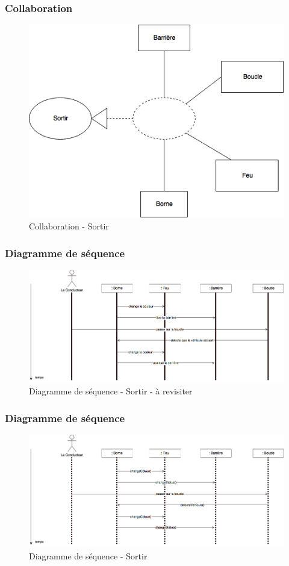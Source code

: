 \subsubsection{Collaboration}
\begin{figure}[!htb]
    \centering
    \includegraphics[scale=0.6]{02_Desenvolvimento/TD2/images/ColaSortir.png}
    \caption{Collaboration - Sortir}
    \label{fig:DARentrer}
\end{figure}
\newpage    
\subsubsection{Diagramme de séquence}
\begin{figure}[!htb]
    \centering
    \includegraphics[scale=0.5]{02_Desenvolvimento/TD2/images/DSSortir.png}
    \caption{Diagramme de séquence - Sortir - à revisiter }
    \label{fig:DARentrer}
\end{figure}
\subsubsection{Diagramme de séquence}
\begin{figure}[!htb]
    \centering
    \includegraphics[scale=0.5]{02_Desenvolvimento/TD2/images/v2-DSSortir.png}
    \caption{Diagramme de séquence - Sortir}
    \label{fig:DARentrer}
\end{figure}